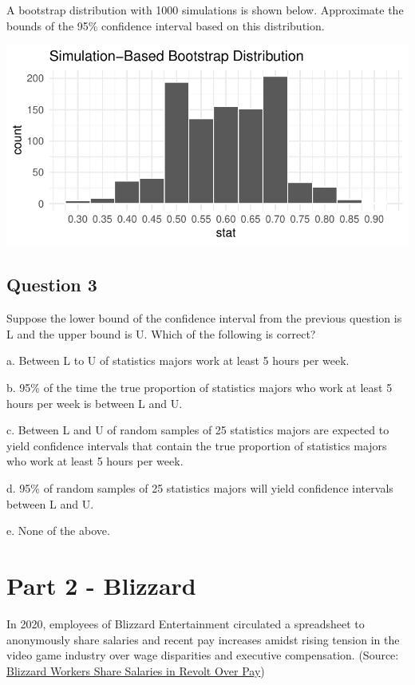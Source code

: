 \documentclass[
  letterpaper,
  DIV=11,
  numbers=noendperiod]{scrartcl}
\begin{document}
A bootstrap distribution with 1000 simulations is shown below.
Approximate the bounds of the 95\% confidence interval based on this
distribution.

\includegraphics{exam-2-review_files/figure-pdf/unnamed-chunk-2-1.pdf}

\hypertarget{question-3}{%
\subsection{Question 3}\label{question-3}}

Suppose the lower bound of the confidence interval from the previous
question is L and the upper bound is U. Which of the following is
correct?

a. Between L to U of statistics majors work at least 5 hours per week.

b. 95\% of the time the true proportion of statistics majors who work at
least 5 hours per week is between L and U.

c. Between L and U of random samples of 25 statistics majors are
expected to yield confidence intervals that contain the true proportion
of statistics majors who work at least 5 hours per week.

d. 95\% of random samples of 25 statistics majors will yield confidence
intervals between L and U.

e. None of the above.

\newpage{}

\hypertarget{part-2---blizzard}{%
\section{Part 2 - Blizzard}\label{part-2---blizzard}}

In 2020, employees of Blizzard Entertainment circulated a spreadsheet to
anonymously share salaries and recent pay increases amidst rising
tension in the video game industry over wage disparities and executive
compensation. (Source:
\href{https://www.bloomberg.com/news/articles/2020-08-03/blizzard-workers-share-salaries-in-revolt-over-wage-disparities}{Blizzard
Workers Share Salaries in Revolt Over Pay})
\end{document}
